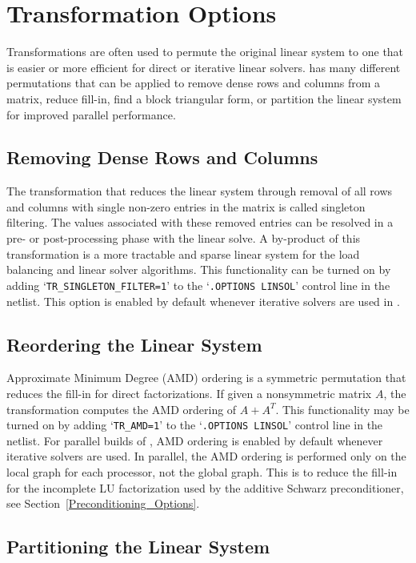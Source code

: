 \section{Transformation Options}
\label{Transformation_Options}

Transformations are often used to permute the original linear system to one that
is easier or more efficient for direct or iterative linear solvers.  \Xyce{} has many different permutations 
that can be applied to remove dense rows and columns from a matrix, reduce fill-in, find a block triangular form, 
or partition the linear system for improved parallel performance. 

\subsection{Removing Dense Rows and Columns}
The transformation that reduces the linear system through removal of all rows and 
columns with single non-zero entries in the matrix is called singleton filtering.  The values
associated with these removed entries can be resolved in a pre- or post-processing
phase with the linear solve.
A by-product of this transformation is a more tractable and sparse 
linear system for the load balancing and linear solver
algorithms.  This functionality can be turned on by adding 
`\texttt{TR\_SINGLETON\_FILTER=1}' to the `\texttt{.OPTIONS LINSOL}'
control line in the netlist.  This option is enabled by default whenever iterative
solvers are used in \Xyce{}.

\subsection{Reordering the Linear System}
Approximate Minimum Degree (AMD) ordering is a symmetric permutation that 
reduces the fill-in for direct factorizations.  If given a nonsymmetric
matrix $A$, the transformation computes the AMD ordering of $A + A^T$.  
This functionality may be turned on by adding `\texttt{TR\_AMD=1}' 
to the `\texttt{.OPTIONS LINSOL}' control line in the netlist. 
For parallel builds of \Xyce{}, AMD ordering is enabled by default whenever iterative solvers
are used.  In parallel, the AMD ordering is performed only on the local graph for
each processor, not the global graph.  This is to reduce the fill-in for the incomplete
LU factorization used by the additive Schwarz preconditioner, see Section~\ref{Preconditioning_Options}.

\subsection{Partitioning the Linear System}
\label{Partitioning_Linear_System}

